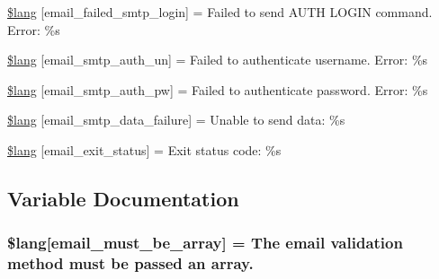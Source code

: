 \begin{DoxyCompactItemize}
\item 
\hyperlink{_admin_2system_2language_2english_2email__lang_8php_a791781c2fd1bd8ec87158be649519621}{\$lang} \mbox{[}\textquotesingle{}email\+\_\+failed\+\_\+smtp\+\_\+login\textquotesingle{}\mbox{]} = \textquotesingle{}Failed to send A\+U\+T\+H L\+O\+G\+I\+N command. Error\+: \%s\textquotesingle{}
\item 
\hyperlink{_admin_2system_2language_2english_2email__lang_8php_a69f2fa5072f039936748571ea5cc9cba}{\$lang} \mbox{[}\textquotesingle{}email\+\_\+smtp\+\_\+auth\+\_\+un\textquotesingle{}\mbox{]} = \textquotesingle{}Failed to authenticate username. Error\+: \%s\textquotesingle{}
\item 
\hyperlink{_admin_2system_2language_2english_2email__lang_8php_a09fd123f0d251a8eac845f985c6583c3}{\$lang} \mbox{[}\textquotesingle{}email\+\_\+smtp\+\_\+auth\+\_\+pw\textquotesingle{}\mbox{]} = \textquotesingle{}Failed to authenticate password. Error\+: \%s\textquotesingle{}
\item 
\hyperlink{_admin_2system_2language_2english_2email__lang_8php_a59801e23c2d745400384098c7bf0a6dc}{\$lang} \mbox{[}\textquotesingle{}email\+\_\+smtp\+\_\+data\+\_\+failure\textquotesingle{}\mbox{]} = \textquotesingle{}Unable to send data\+: \%s\textquotesingle{}
\item 
\hyperlink{_admin_2system_2language_2english_2email__lang_8php_a32b0c2f50acd03defc88df937ee2877f}{\$lang} \mbox{[}\textquotesingle{}email\+\_\+exit\+\_\+status\textquotesingle{}\mbox{]} = \textquotesingle{}Exit status code\+: \%s\textquotesingle{}
\end{DoxyCompactItemize}


\subsection{Variable Documentation}
\hypertarget{_admin_2system_2language_2english_2email__lang_8php_ac8c4b077e854bbdbb9a37b2d7f7c47fc}{}
\subsubsection[{\$lang}]{\setlength{\rightskip}{0pt plus 5cm}\$lang\mbox{[}\textquotesingle{}email\+\_\+must\+\_\+be\+\_\+array\textquotesingle{}\mbox{]} = \textquotesingle{}The email validation method must be passed an array.\textquotesingle{}}\label{_admin_2system_2language_2english_2email__lang_8php_ac8c4b077e854bbdbb9a37b2d7f7c47fc}
\hypertarget{_admin_2system_2language_2english_2email__lang_8php_a37759f6c728f3aaf8df6ca5bb8a3e832}{}
